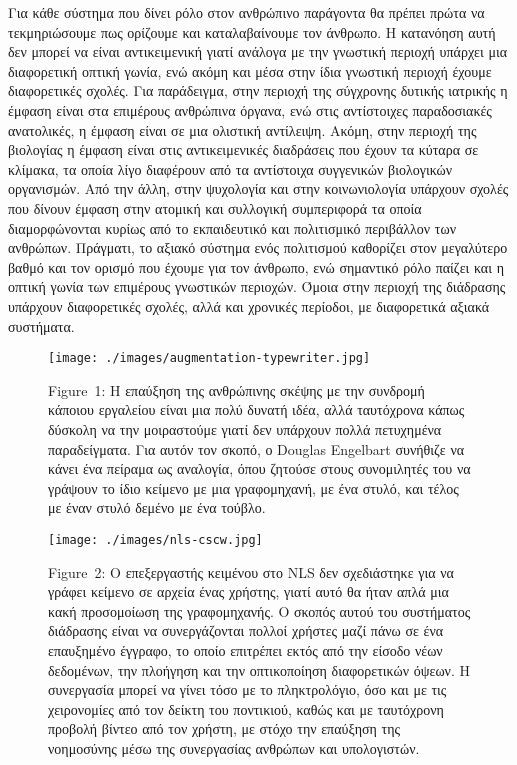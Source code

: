 \documentclass[
]{article}
\begin{document}
Για κάθε σύστημα που δίνει ρόλο στον ανθρώπινο παράγοντα θα πρέπει πρώτα
να τεκμηριώσουμε πως ορίζουμε και καταλαβαίνουμε τον άνθρωπο. Η
κατανόηση αυτή δεν μπορεί να είναι αντικειμενική γιατί ανάλογα με την
γνωστική περιοχή υπάρχει μια διαφορετική οπτική γωνία, ενώ ακόμη και
μέσα στην ίδια γνωστική περιοχή έχουμε διαφορετικές σχολές. Για
παράδειγμα, στην περιοχή της σύγχρονης δυτικής ιατρικής η έμφαση είναι
στα επιμέρους ανθρώπινα όργανα, ενώ στις αντίστοιχες παραδοσιακές
ανατολικές, η έμφαση είναι σε μια ολιστική αντίλειψη. Ακόμη, στην
περιοχή της βιολογίας η έμφαση είναι στις αντικειμενικές διαδράσεις που
έχουν τα κύταρα σε κλίμακα, τα οποία λίγο διαφέρουν από τα αντίστοιχα
συγγενικών βιολογικών οργανισμών. Από την άλλη, στην ψυχολογία και στην
κοινωνιολογία υπάρχουν σχολές που δίνουν έμφαση στην ατομική και
συλλογική συμπεριφορά τα οποία διαμορφώνονται κυρίως από το εκπαιδευτικό
και πολιτισμικό περιβάλλον των ανθρώπων. Πράγματι, το αξιακό σύστημα
ενός πολιτισμού καθορίζει στον μεγαλύτερο βαθμό και τον ορισμό που
έχουμε για τον άνθρωπο, ενώ σημαντικό ρόλο παίζει και η οπτική γωνία των
επιμέρους γνωστικών περιοχών. Όμοια στην περιοχή της διάδρασης υπάρχουν
διαφορετικές σχολές, αλλά και χρονικές περίοδοι, με διαφορετικά αξιακά
συστήματα.

\leavevmode{}%
\begin{figure}
\hypertarget{fig:augmentation-typewriter}{%
\centering
\texttt{[image: ./images/augmentation-typewriter.jpg]}
\caption{Figure~1: Η επαύξηση της ανθρώπινης σκέψης με την συνδρομή
κάποιου εργαλείου είναι μια πολύ δυνατή ιδέα, αλλά ταυτόχρονα κάπως
δύσκολη να την μοιραστούμε γιατί δεν υπάρχουν πολλά πετυχημένα
παραδείγματα. Για αυτόν τον σκοπό, ο Douglas Engelbart συνήθιζε να κάνει
ένα πείραμα ως αναλογία, όπου ζητούσε στους συνομιλητές του να γράψουν
το ίδιο κείμενο με μια γραφομηχανή, με ένα στυλό, και τέλος με έναν
στυλό δεμένο με ένα τούβλο.}\label{fig:augmentation-typewriter}
}
\end{figure}

\leavevmode{}%
\begin{figure}
\hypertarget{fig:nls-cscw}{%
\centering
\texttt{[image: ./images/nls-cscw.jpg]}
\caption{Figure~2: Ο επεξεργαστής κειμένου στο NLS δεν σχεδιάστηκε για
να γράφει κείμενο σε αρχεία ένας χρήστης, γιατί αυτό θα ήταν απλά μια
κακή προσομοίωση της γραφομηχανής. Ο σκοπός αυτού του συστήματος
διάδρασης είναι να συνεργάζονται πολλοί χρήστες μαζί πάνω σε ένα
επαυξημένο έγγραφο, το οποίο επιτρέπει εκτός από την είσοδο νέων
δεδομένων, την πλοήγηση και την οπτικοποίηση διαφορετικών όψεων. Η
συνεργασία μπορεί να γίνει τόσο με το πληκτρολόγιο, όσο και με τις
χειρονομίες από τον δείκτη του ποντικιού, καθώς και με ταυτόχρονη
προβολή βίντεο από τον χρήστη, με στόχο την επαύξηση της νοημοσύνης μέσω
της συνεργασίας ανθρώπων και υπολογιστών.}\label{fig:nls-cscw}
}
\end{figure}
\end{document}
